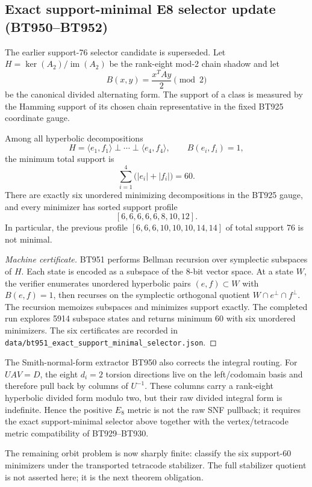 
\subsection{Exact support-minimal E8 selector update (BT950--BT952)}\label{subsec:bt952-exact-e8-selector}

The earlier support-76 selector candidate is superseded.  Let
\(H=\ker(A_2)/\operatorname{im}(A_2)\) be the rank-eight mod-2 chain shadow and
let
\[
  B(x,y)=\frac{x^T A y}{2}\pmod 2
\]
be the canonical divided alternating form.  The support of a class is measured
by the Hamming support of its chosen chain representative in the fixed BT925
coordinate gauge.

\begin{theorem}
Among all hyperbolic decompositions
\[
  H = \langle e_1,f_1\rangle \perp \cdots \perp \langle e_4,f_4\rangle,
  \qquad B(e_i,f_i)=1,
\]
the minimum total support is
\[
  \sum_{i=1}^4 \bigl(|e_i|+|f_i|\bigr)=60.
\]
There are exactly six unordered minimizing decompositions in the BT925 gauge,
and every minimizer has sorted support profile
\[
  [6,6,6,6,6,8,10,12].
\]
In particular, the previous profile
\([6,6,6,10,10,10,14,14]\) of total support 76 is not minimal.
\end{theorem}

\begin{proof}[Machine certificate]
BT951 performs Bellman recursion over symplectic subspaces of \(H\).  Each
state is encoded as a subspace of the 8-bit vector space.  At a state \(W\), the
verifier enumerates unordered hyperbolic pairs \((e,f)\subset W\) with
\(B(e,f)=1\), then recurses on the symplectic orthogonal quotient
\(W\cap e^\perp\cap f^\perp\).  The recursion memoizes subspaces and minimizes
support exactly.  The completed run explores 5914 subspace states and returns
minimum 60 with six unordered minimizers.  The six certificates are recorded in
\texttt{data/bt951\_exact\_support\_minimal\_selector.json}.
\end{proof}

The Smith-normal-form extractor BT950 also corrects the integral routing.  For
\(UAV=D\), the eight \(d_i=2\) torsion directions live on the left/codomain
basis and therefore pull back by columns of \(U^{-1}\).  These columns carry a
rank-eight hyperbolic divided form modulo two, but their raw divided integral
form is indefinite.  Hence the positive \(E_8\) metric is not the raw SNF
pullback; it requires the exact support-minimal selector above together with the
vertex/tetracode metric compatibility of BT929--BT930.

The remaining orbit problem is now sharply finite: classify the six support-60
minimizers under the transported tetracode stabilizer.  The full stabilizer
quotient is not asserted here; it is the next theorem obligation.
